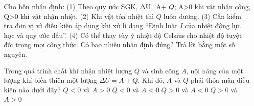 \begin{ex}
Cho bốn nhận định: (1) Theo quy ước SGK, ΔU=A+ $Q$; A>0 khi vật nhận công, Q>0 khi vật nhận nhiệt. (2) Khi vật tỏa nhiệt thì $Q$ luôn dương. (3) Cần kiểm tra đơn vị và điều kiện áp dụng khi xử lí dạng “Định luật $I$ của nhiệt động lực học và quy ước dấu”. (4) Có thể thay tùy ý nhiệt độ Celsius cho nhiệt độ tuyệt đối trong mọi công thức. Có bao nhiêu nhận định đúng? Trả lời bằng một số nguyên.
\end{ex}


\begin{ex}
	Trong quá trình chất khí nhận nhiệt lượng $Q$ và sinh công $A$, nội năng của một lượng khí biến thiên một lượng $\Delta U = A + Q$. Khi đó, $A$ và $Q$ phải thỏa mãn điều kiện nào dưới đây?
	\choice 
	{$Q < 0$ và $A > 0$}
	{$Q < 0$ và $A < 0$}
	{\True $Q > 0$ và $A < 0$}
	{$Q > 0$ và $A > 0$}
\end{ex}

